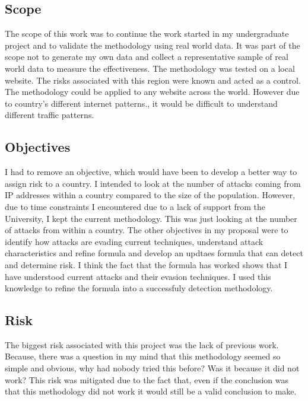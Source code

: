 \subsection{Scope}

The scope of this work was to continue the work started in my undergraduate project and to validate the methodology using real world data. It was part of the scope not to generate my own data and collect a representative sample of real world data to measure the effectiveness. The methodology was tested on a local website. The risks associated with this region were known and acted as a control. The methodology could be applied to any website across the world. However due to country's different internet patterns., it would be difficult to understand different traffic patterns. 



\subsection{Objectives}

I had to remove an objective, which would have been to develop a better way to assign risk to a country. I intended to look at the number of attacks coming from IP addresses within a country compared to the size of the population. However, due to time constraints I encountered due to a lack of support from the University, I kept the current methodology. This was just looking at the number of attacks from within a country. The other objectives in my proposal were to identify how attacks are evading current techniques, understand attack characteristics and refine formula and develop an updtaes formula that can detect and determine risk. I think the fact that the formula has worked shows that I have understood current attacks and their evasion techniques. I used this knowledge to refine the formula into a successfuly detection methodology.

\subsection{Risk}

The biggest risk associated with this project was the lack of previous work. Because, there was a question in my mind that this methodology seemed so simple and obvious, why had nobody tried this before? Was it because it did not work? This risk was mitigated due to the fact that, even if the conclusion was that this methodology did not work it would still be a valid conclusion to make.